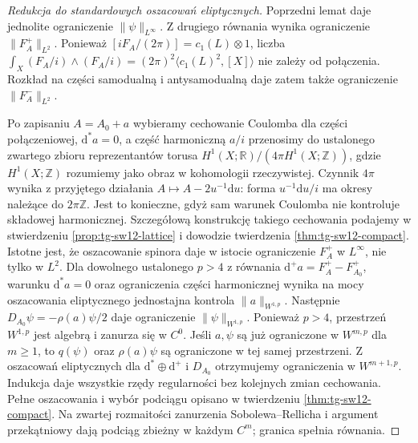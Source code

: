 \begin{proof}[Redukcja do standardowych oszacowań eliptycznych]
Poprzedni lemat daje jednolite ograniczenie
$\|\psi\|_{L^\infty}$. Z drugiego równania wynika
ograniczenie $\|F_A^+\|_{L^2}$.
Ponieważ
$[iF_A/(2\pi)]=c_1(L)\otimes1$, liczba
$\int_X(F_A/i)\wedge(F_A/i)=(2\pi)^2\langle c_1(L)^2,[X]\rangle$
nie zależy od połączenia. Rozkład na części samodualną
i antysamodualną daje zatem także ograniczenie
$\|F_A^-\|_{L^2}$.

Po zapisaniu $A=A_0+a$ wybieramy cechowanie Coulomba
dla części połączeniowej, $\mathrm d^*a=0$, a część harmoniczną $a/i$ przenosimy do
ustalonego zwartego zbioru reprezentantów torusa
$H^1(X;\mathbb R)/(4\pi H^1(X;\mathbb Z))$,
gdzie $H^1(X;\mathbb Z)$ rozumiemy jako obraz w kohomologii
rzeczywistej. Czynnik $4\pi$ wynika z przyjętego działania
$A\mapsto A-2u^{-1}\mathrm du$: forma $u^{-1}\mathrm du/i$
ma okresy należące do $2\pi\mathbb Z$.
Jest to konieczne, gdyż sam warunek Coulomba
nie kontroluje składowej harmonicznej.
Szczegółową konstrukcję takiego cechowania podajemy
w stwierdzeniu \ref{prop:tg-sw12-lattice} i dowodzie
twierdzenia \ref{thm:tg-sw12-compact}.
Istotne jest, że oszacowanie spinora daje w istocie
ograniczenie $F_A^+$ w $L^\infty$, nie tylko w $L^2$.
Dla dowolnego ustalonego $p>4$ z równania
$\mathrm d^+a=F_A^+-F_{A_0}^+$, warunku
$\mathrm d^*a=0$ oraz ograniczenia części harmonicznej
wynika na mocy oszacowania eliptycznego jednostajna
kontrola $\|a\|_{W^{1,p}}$.
Następnie $D_{A_0}\psi=-\rho(a)\psi/2$ daje
ograniczenie $\|\psi\|_{W^{1,p}}$.
Ponieważ $p>4$, przestrzeń $W^{1,p}$ jest algebrą
i zanurza się w $C^0$. Jeśli $a,\psi$ są już ograniczone
w $W^{m,p}$ dla $m\geq1$, to $q(\psi)$ oraz
$\rho(a)\psi$ są ograniczone w tej samej przestrzeni.
Z oszacowań eliptycznych dla
$\mathrm d^*\oplus\mathrm d^+$ i $D_{A_0}$
otrzymujemy ograniczenia w $W^{m+1,p}$.
Indukcja daje wszystkie rzędy regularności bez
kolejnych zmian cechowania. Pełne oszacowania
i wybór podciągu opisano w twierdzeniu
\ref{thm:tg-sw12-compact}.
Na zwartej rozmaitości zanurzenia Sobolewa--Rellicha
i argument przekątniowy dają podciąg zbieżny w każdym
$C^m$; granica spełnia równania.


\end{proof}
